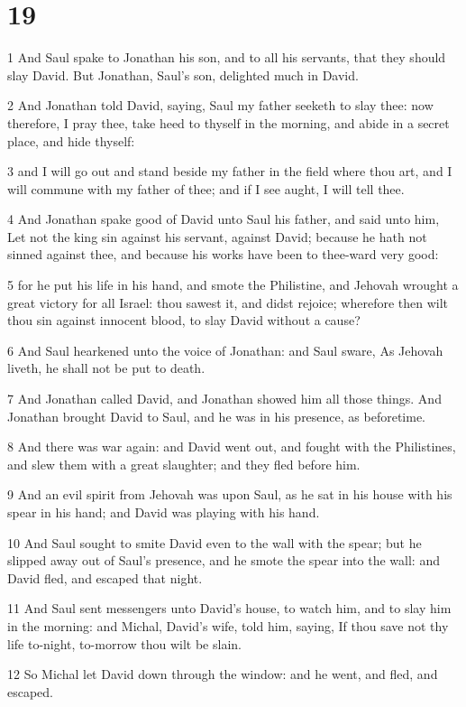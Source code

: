 \chapter{19}

\par 1 And Saul spake to Jonathan his son, and to all his servants, that they should slay David. But Jonathan, Saul's son, delighted much in David.
\par 2 And Jonathan told David, saying, Saul my father seeketh to slay thee: now therefore, I pray thee, take heed to thyself in the morning, and abide in a secret place, and hide thyself:
\par 3 and I will go out and stand beside my father in the field where thou art, and I will commune with my father of thee; and if I see aught, I will tell thee.
\par 4 And Jonathan spake good of David unto Saul his father, and said unto him, Let not the king sin against his servant, against David; because he hath not sinned against thee, and because his works have been to thee-ward very good:
\par 5 for he put his life in his hand, and smote the Philistine, and Jehovah wrought a great victory for all Israel: thou sawest it, and didst rejoice; wherefore then wilt thou sin against innocent blood, to slay David without a cause?
\par 6 And Saul hearkened unto the voice of Jonathan: and Saul sware, As Jehovah liveth, he shall not be put to death.
\par 7 And Jonathan called David, and Jonathan showed him all those things. And Jonathan brought David to Saul, and he was in his presence, as beforetime.
\par 8 And there was war again: and David went out, and fought with the Philistines, and slew them with a great slaughter; and they fled before him.
\par 9 And an evil spirit from Jehovah was upon Saul, as he sat in his house with his spear in his hand; and David was playing with his hand.
\par 10 And Saul sought to smite David even to the wall with the spear; but he slipped away out of Saul's presence, and he smote the spear into the wall: and David fled, and escaped that night.
\par 11 And Saul sent messengers unto David's house, to watch him, and to slay him in the morning: and Michal, David's wife, told him, saying, If thou save not thy life to-night, to-morrow thou wilt be slain.
\par 12 So Michal let David down through the window: and he went, and fled, and escaped.
